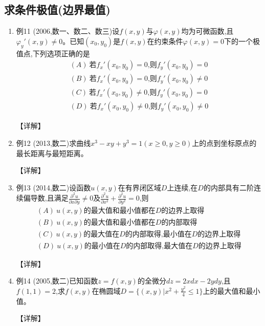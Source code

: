 \documentclass[12pt, a4paper, oneside, UTF8]{ctexbook}
\begin{document}
\subsection{求条件极值(边界最值)}

\begin{enumerate}[label=\arabic*.,start=11]
    \item 例11 (2006,数一、数二、数三)设$f(x,y)$与$\varphi(x,y)$均为可微函数,且$\varphi_y'(x,y)\neq 0$。已知$(x_0,y_0)$是$f(x,y)$在约束条件$\varphi(x,y)=0$下的一个极值点,下列选项正确的是
    \begin{align*}
        (A)\ \text{若}f_x'(x_0,y_0)=0\text{,则}f_y'(x_0,y_0)=0 \\
        (B)\ \text{若}f_x'(x_0,y_0)=0\text{,则}f_y'(x_0,y_0)\neq 0 \\
        (C)\ \text{若}f_x'(x_0,y_0)\neq 0\text{,则}f_y'(x_0,y_0)=0 \\
        (D)\ \text{若}f_x'(x_0,y_0)\neq 0\text{,则}f_y'(x_0,y_0)\neq 0
    \end{align*}
    
    \begin{solution}
    【详解】
    \end{solution}
    
    \item 例12 (2013,数二)求曲线$x^3-xy+y^3=1(x\geq 0,y\geq 0)$上的点到坐标原点的最长距离与最短距离。
    
    \begin{solution}
    【详解】
    \end{solution}
    
    \item 例13 (2014,数二)设函数$u(x,y)$在有界闭区域$D$上连续,在$D$的内部具有二阶连续偏导数,且满足$\frac{\partial^2 u}{\partial x\partial y}\neq 0$及$\frac{\partial^2 u}{\partial x^2}+\frac{\partial^2 u}{\partial y^2}=0$,则
    \begin{align*}
        (A)\ u(x,y)\text{的最大值和最小值都在}D\text{的边界上取得} \\
        (B)\ u(x,y)\text{的最大值和最小值都在}D\text{的内部取得} \\
        (C)\ u(x,y)\text{的最大值在}D\text{的内部取得,最小值在}D\text{的边界上取得} \\
        (D)\ u(x,y)\text{的最小值在}D\text{的内部取得,最大值在}D\text{的边界上取得}
    \end{align*}
    
    \begin{solution}
    【详解】
    \end{solution}
    
    \item 例14 (2005,数二)已知函数$z=f(x,y)$的全微分$dz=2xdx-2ydy$,且$f(1,1)=2$,求$f(x,y)$在椭圆域$D=\{(x,y)|x^2+\frac{y^2}{4}\leq 1\}$上的最大值和最小值。
    
    \begin{solution}
    【详解】
    \end{solution}
\end{enumerate}
\end{document}

